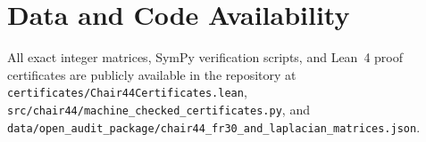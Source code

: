 \documentclass[11pt,a4paper]{article}
\theoremstyle{definition}
\begin{document}
\section*{Data and Code Availability}
All exact integer matrices, SymPy verification scripts, and Lean~4 proof certificates are publicly available in the repository at \texttt{certificates/Chair44Certificates.lean}, \texttt{src/chair44/machine\_checked\_certificates.py}, and \texttt{data/open\_audit\_package/chair44\_fr30\_and\_laplacian\_matrices.json}.
\end{document}
